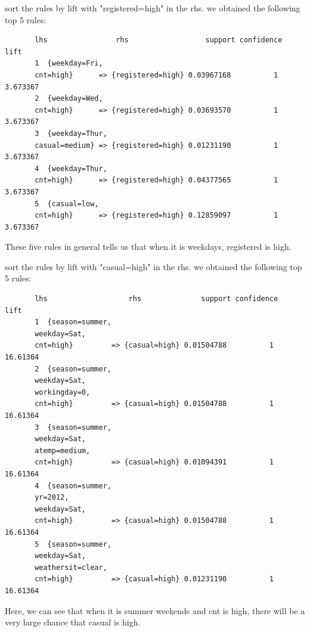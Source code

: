 \documentclass[12pt]{article}
\begin{document}
    sort the rules by lift with "registered=high" in the rhs. we obtained the following top 5 rules: \color{blue}
	\begin{verbatim}
	   lhs                rhs                  support confidence     lift
	   1  {weekday=Fri,                                                      
	   cnt=high}      => {registered=high} 0.03967168          1 3.673367
	   2  {weekday=Wed,                                                      
	   cnt=high}      => {registered=high} 0.03693570          1 3.673367
	   3  {weekday=Thur,                                                     
	   casual=medium} => {registered=high} 0.01231190          1 3.673367
	   4  {weekday=Thur,                                                     
	   cnt=high}      => {registered=high} 0.04377565          1 3.673367
	   5  {casual=low,                                                       
	   cnt=high}      => {registered=high} 0.12859097          1 3.673367
	\end{verbatim}\color{black}
	These five rules in general tells us that when it is weekdays, registered is high.
	
	 sort the rules by lift with "casual=high" in the rhs. we obtained the following top 5 rules: \color{blue}
	\begin{verbatim}
	   lhs                   rhs              support confidence     lift
	   1  {season=summer,                                                   
	   weekday=Sat,                                                     
	   cnt=high}         => {casual=high} 0.01504788          1 16.61364
	   2  {season=summer,                                                   
	   weekday=Sat,                                                     
	   workingday=0,                                                    
	   cnt=high}         => {casual=high} 0.01504788          1 16.61364
	   3  {season=summer,                                                   
	   weekday=Sat,                                                     
	   atemp=medium,                                                    
	   cnt=high}         => {casual=high} 0.01094391          1 16.61364
	   4  {season=summer,                                                   
	   yr=2012,                                                         
	   weekday=Sat,                                                     
	   cnt=high}         => {casual=high} 0.01504788          1 16.61364
	   5  {season=summer,                                                   
	   weekday=Sat,                                                     
	   weathersit=clear,                                                
	   cnt=high}         => {casual=high} 0.01231190          1 16.61364
	\end{verbatim}\color{black}
	Here, we can see that when it is summer weekends and cnt is high, there will be a very large chance that casual is high.  
	
\end{document}
